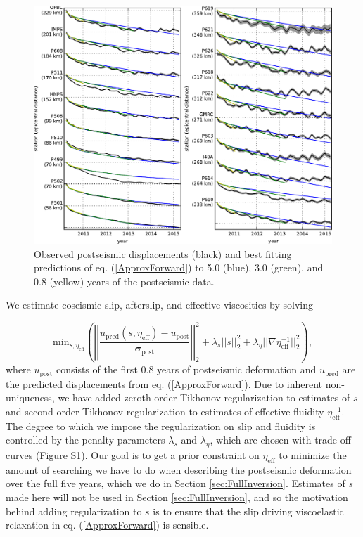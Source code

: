 \documentclass[draft,linenumbers]{AGUJournal}
\begin{document}
\begin{figure}
\includegraphics[scale=0.9]{Figures/2016jb013114-p10}
\centering 
\caption{Observed postseismic displacements (black) and best fitting predictions of eq. (\ref{ApproxForward}) to 5.0 (blue), 3.0 (green), and 0.8 (yellow) years of the postseismic data.} 
\label{fig:RecordSection1}
\end{figure}

We estimate coseismic slip, afterslip, and effective viscosities by solving 

\begin{equation}\label{ObjectiveFunction}
 \mathrm{min}_{s,\eta_\mathrm{eff}} \left(\left|\left|
 \frac{u_\mathrm{pred}(s,\eta_\mathrm{eff}) - u_\mathrm{post}}
 {\mathbf{\sigma_\mathrm{post}}}\right|\right|_2^2 + 
 \lambda_s||s||_2^2 + 
 \lambda_\eta||\nabla \eta_{\mathrm{eff}}^{-1}||_2^2\right),
\end{equation} 
where $u_\mathrm{post}$ consists of the first 0.8 years of postseismic deformation and $u_\mathrm{pred}$ are the predicted displacements from eq. (\ref{ApproxForward}).  Due to inherent non-uniqueness, we have added zeroth-order Tikhonov regularization to estimates of $s$ and second-order Tikhonov regularization to estimates of effective fluidity $\eta_\mathrm{eff}^{-1}$. The degree to which we impose the regularization on slip and fluidity is controlled by the penalty parameters $\lambda_s$ and $\lambda_\eta$, which are chosen with trade-off curves (Figure S1).  Our goal is to get a prior constraint on $\eta_{\mathrm{eff}}$ to minimize the amount of searching we have to do when describing the postseismic deformation over the full five years, which we do in Section \ref{sec:FullInversion}.  Estimates of $s$ made here will not be used in Section \ref{sec:FullInversion}, and so the motivation behind adding regularization to $s$ is to ensure that the slip driving viscoelastic relaxation in eq. (\ref{ApproxForward}) is sensible.  
\end{document}
